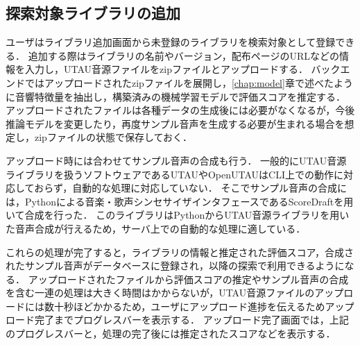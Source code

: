 \subsection{探索対象ライブラリの追加}

ユーザはライブラリ追加画面から未登録のライブラリを検索対象として登録できる．
追加する際はライブラリの名前やバージョン，配布ページのURLなどの情報を入力し，UTAU音源ファイルをzipファイルとアップロードする．
バックエンドではアップロードされたzipファイルを展開し，\ref{chap:model}章で述べたように音響特徴量を抽出し，構築済みの機械学習モデルで評価スコアを推定する．
アップロードされたファイルは各種データの生成後には必要がなくなるが，今後推論モデルを変更したり，再度サンプル音声を生成する必要が生まれる場合を想定し，zipファイルの状態で保存しておく．

アップロード時には合わせてサンプル音声の合成も行う．
一般的にUTAU音源ライブラリを扱うソフトウェアであるUTAUやOpenUTAUはCLI上での動作に対応しておらず，自動的な処理に対応していない．
そこでサンプル音声の合成には，Pythonによる音楽・歌声シンセサイザインタフェースであるScoreDraftを用いて合成を行った．
このライブラリはPythonからUTAU音源ライブラリを用いた音声合成が行えるため，サーバ上での自動的な処理に適している．

これらの処理が完了すると，ライブラリの情報と推定された評価スコア，合成されたサンプル音声がデータベースに登録され，以降の探索で利用できるようになる．
アップロードされたファイルから評価スコアの推定やサンプル音声の合成を含む一連の処理は大きく時間はかからないが，UTAU音源ファイルのアップロードには数十秒ほどかかるため，ユーザにアップロード進捗を伝えるためアップロード完了までプログレスバーを表示する．
アップロード完了画面では，上記のプログレスバーと，処理の完了後には推定されたスコアなどを表示する．

